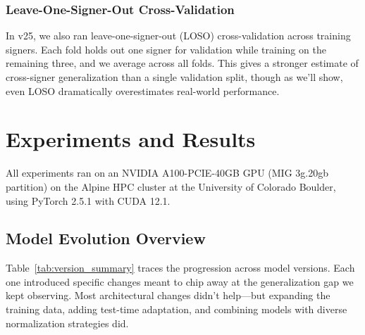 \documentclass[conference]{IEEEtran}
\begin{document}
\subsubsection{Leave-One-Signer-Out Cross-Validation}
In v25, we also ran leave-one-signer-out (LOSO) cross-validation across training signers. Each fold holds out one signer for validation while training on the remaining three, and we average across all folds. This gives a stronger estimate of cross-signer generalization than a single validation split, though as we'll show, even LOSO dramatically overestimates real-world performance.

\section{Experiments and Results}

All experiments ran on an NVIDIA A100-PCIE-40GB GPU (MIG 3g.20gb partition) on the Alpine HPC cluster at the University of Colorado Boulder, using PyTorch 2.5.1 with CUDA 12.1.

\subsection{Model Evolution Overview}

Table~\ref{tab:version_summary} traces the progression across model versions. Each one introduced specific changes meant to chip away at the generalization gap we kept observing. Most architectural changes didn't help---but expanding the training data, adding test-time adaptation, and combining models with diverse normalization strategies did.
\end{document}
